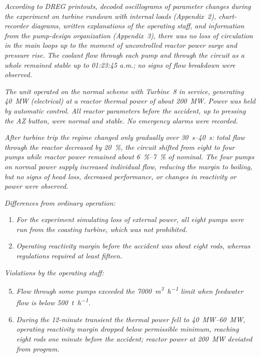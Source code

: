 \documentclass[openright]{bookest}
\begin{document}
\begin{personal}
\textit{According to DREG printouts, decoded oscillograms of parameter changes during the experiment on turbine rundown with internal loads (Appendix~2), chart-recorder diagrams, written explanations of the operating staff, and information from the pump-design organization (Appendix~3), there was no loss of circulation in the main loops up to the moment of uncontrolled reactor power surge and pressure rise. The coolant flow through each pump and through the circuit as a whole remained stable up to 01:23:45 a.m.; no signs of flow breakdown were observed.}

\textit{The unit operated on the normal scheme with Turbine~8 in service, generating \qty{40}{\mega\watt} (electrical) at a reactor thermal power of about \qty{200}{\mega\watt}. Power was held by automatic control. All reactor parameters before the accident, up to pressing the AZ button, were normal and stable. No emergency alarms were recorded.}

\textit{After turbine trip the regime changed only gradually over \qtyrange{30}{40}{\second}: total flow through the reactor decreased by \qty{20}{\percent}, the circuit shifted from eight to four pumps while reactor power remained about \qtyrange{6}{7}{\percent} of nominal. The four pumps on normal power supply increased individual flow, reducing the margin to boiling, but no signs of head loss, decreased performance, or changes in reactivity or power were observed.}

\textit{Differences from ordinary operation:}
\begin{enumerate}
\item \textit{For the experiment simulating loss of external power, all eight pumps were run from the coasting turbine, which was not prohibited.}
\item \textit{Operating reactivity margin before the accident was about eight rods, whereas regulations required at least fifteen.}
\end{enumerate}

\textit{Violations by the operating staff:}
\begin{enumerate}
\setcounter{enumi}{4}
\item \textit{Flow through some pumps exceeded the \qty{7000}{\meter\cubed\per\hour} limit when feedwater flow is below \qty{500}{\tonne\per\hour}.}
\item \textit{During the \num{12}-minute transient the thermal power fell to \qtyrange[range-phrase=\text{--}]{40}{60}{\mega\watt}, operating reactivity margin dropped below permissible minimum, reaching eight rods one minute before the accident; reactor power at \qty{200}{\mega\watt} deviated from program.}
\end{enumerate}
\end{personal}
\end{document}
